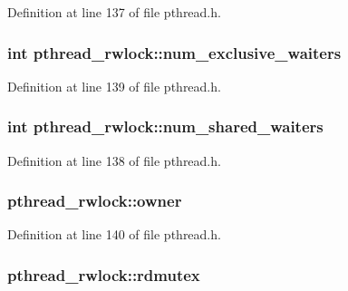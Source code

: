 Definition at line 137 of file pthread.\+h.

\hypertarget{structpthread__rwlock_a5d8b56e7998376aa9f5908a560daadb7}{
\subsubsection[{num\+\_\+exclusive\+\_\+waiters}]{\setlength{\rightskip}{0pt plus 5cm}int pthread\+\_\+rwlock\+::num\+\_\+exclusive\+\_\+waiters}}\label{structpthread__rwlock_a5d8b56e7998376aa9f5908a560daadb7}


Definition at line 139 of file pthread.\+h.

\hypertarget{structpthread__rwlock_af637581bd0ea0328763d041937160fff}{
\subsubsection[{num\+\_\+shared\+\_\+waiters}]{\setlength{\rightskip}{0pt plus 5cm}int pthread\+\_\+rwlock\+::num\+\_\+shared\+\_\+waiters}}\label{structpthread__rwlock_af637581bd0ea0328763d041937160fff}


Definition at line 138 of file pthread.\+h.

\hypertarget{structpthread__rwlock_a7918a35d8e929df9c7f1fd9f12e9efcf}{
\subsubsection[{owner}]{ pthread\+\_\+rwlock\+::owner}}\label{structpthread__rwlock_a7918a35d8e929df9c7f1fd9f12e9efcf}


Definition at line 140 of file pthread.\+h.

\hypertarget{structpthread__rwlock_aa525fa5ae59171418ede7d1894bf21fe}{
\subsubsection[{rdmutex}]{ pthread\+\_\+rwlock\+::rdmutex}}\label{structpthread__rwlock_aa525fa5ae59171418ede7d1894bf21fe}


